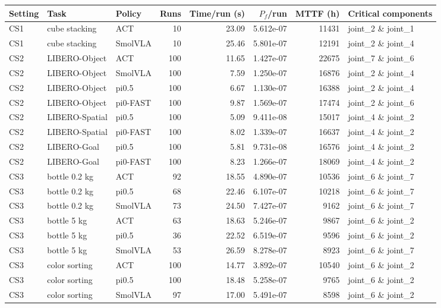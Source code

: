 \begin{tabular}{lllrrrrl}
\toprule
Setting & Task & Policy & Runs & Time/run (s) & $P_f$/run & MTTF (h) & Critical components \\
\midrule
CS1 & cube stacking & ACT & 10 & 23.09 & 5.612e-07 & 11431 & joint\_2 \& joint\_1 \\
CS1 & cube stacking & SmolVLA & 10 & 25.46 & 5.801e-07 & 12191 & joint\_2 \& joint\_4 \\
CS2 & LIBERO-Object & ACT & 100 & 11.65 & 1.427e-07 & 22675 & joint\_7 \& joint\_6 \\
CS2 & LIBERO-Object & SmolVLA & 100 & 7.59 & 1.250e-07 & 16876 & joint\_2 \& joint\_4 \\
CS2 & LIBERO-Object & pi0.5 & 100 & 6.67 & 1.130e-07 & 16388 & joint\_2 \& joint\_4 \\
CS2 & LIBERO-Object & pi0-FAST & 100 & 9.87 & 1.569e-07 & 17474 & joint\_2 \& joint\_6 \\
CS2 & LIBERO-Spatial & pi0.5 & 100 & 5.09 & 9.411e-08 & 15017 & joint\_4 \& joint\_2 \\
CS2 & LIBERO-Spatial & pi0-FAST & 100 & 8.02 & 1.339e-07 & 16637 & joint\_4 \& joint\_2 \\
CS2 & LIBERO-Goal & pi0.5 & 100 & 5.81 & 9.731e-08 & 16576 & joint\_4 \& joint\_2 \\
CS2 & LIBERO-Goal & pi0-FAST & 100 & 8.23 & 1.266e-07 & 18069 & joint\_4 \& joint\_2 \\
CS3 & bottle 0.2 kg & ACT & 92 & 18.55 & 4.890e-07 & 10536 & joint\_6 \& joint\_7 \\
CS3 & bottle 0.2 kg & pi0.5 & 68 & 22.46 & 6.107e-07 & 10218 & joint\_6 \& joint\_7 \\
CS3 & bottle 0.2 kg & SmolVLA & 73 & 24.50 & 7.427e-07 & 9162 & joint\_6 \& joint\_7 \\
CS3 & bottle 5 kg & ACT & 63 & 18.63 & 5.246e-07 & 9867 & joint\_6 \& joint\_2 \\
CS3 & bottle 5 kg & pi0.5 & 36 & 22.52 & 6.519e-07 & 9596 & joint\_6 \& joint\_2 \\
CS3 & bottle 5 kg & SmolVLA & 53 & 26.59 & 8.278e-07 & 8923 & joint\_6 \& joint\_7 \\
CS3 & color sorting & ACT & 100 & 14.77 & 3.892e-07 & 10540 & joint\_6 \& joint\_2 \\
CS3 & color sorting & pi0.5 & 100 & 18.48 & 5.258e-07 & 9765 & joint\_6 \& joint\_2 \\
CS3 & color sorting & SmolVLA & 97 & 17.00 & 5.491e-07 & 8598 & joint\_6 \& joint\_2 \\

\end{tabular}
